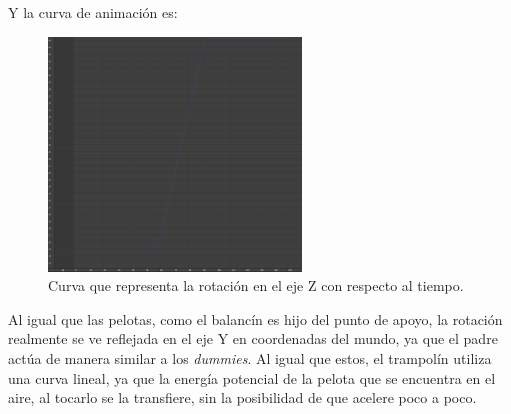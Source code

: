 Y la curva de animación es:

\begin{figure}[H]
    \centering
    \includegraphics[width=0.6\textwidth]{imagenes/curvas/Trampolin/blue.png}
    \caption{Curva que representa la rotación en el eje Z con respecto al tiempo.}
 \end{figure}

 Al igual que las pelotas, como el balancín es hijo del punto de apoyo, la rotación realmente se ve reflejada en el eje Y en coordenadas del mundo, ya que el padre actúa de manera similar a los \textit{dummies}. Al igual que estos, el trampolín utiliza una curva lineal, ya que la energía potencial de la pelota que se encuentra en el aire, al tocarlo se la transfiere, sin la posibilidad de que acelere poco a poco.